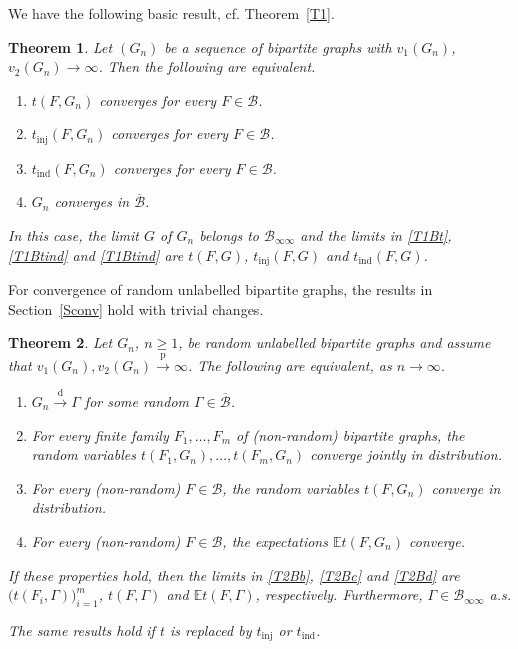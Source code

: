 \documentclass[11pt,reqno,tbtags]{amsart}
\numberwithin{equation}{section}
\newtheorem{theorem}{Theorem}[section]
\theoremstyle{definition}
\theoremstyle{remark}
\newenvironment{romenumerate}{\begin{enumerate}%
 \renewcommand{\labelenumi}{\textup{(\roman{enumi})}}%
 \renewcommand{\theenumi}{\textup{(\roman{enumi})}}%
 }{\end{enumerate}}
\newcommand{\refT}[1]{Theorem~\ref{#1}}
\newcommand{\refS}[1]{Section~\ref{#1}}
\newcommand\bigpar[1]{\bigl(#1\bigr)}
\newcommand\ntoo{\ensuremath{{n\to\infty}}}
\newcommand\cf{cf.\spacefactor=1000}
\newcommand{\tend}{\longrightarrow}
\newcommand\dto{\overset{\mathrm{d}}{\tend}}
\newcommand\pto{\overset{\mathrm{p}}{\tend}}
\newcommand\E{\operatorname{\mathbb E{}}}
\newcommand\gG{\Gamma}
\newcommand\cB{\mathcal B}
\renewcommand{\=}{:=}
\newcommand{\tinj}{t_{\mathrm{inj}}}
\newcommand{\tind}{t_{\mathrm{ind}}}
\newcommand{\BUxx}[2]{\cB_{#1#2}}
\newcommand{\cbq}{\overline{\cB}}
\newcommand{\cboo}{\BUxx{\infty}{\infty}}
\begin{document}
We have the following basic result, \cf{}
\refT{T1}.

\begin{theorem}\label{T1B}
 Let $(G_n)$ be a sequence of bipartite graphs with
 $v_1(G_n)$, $v_2(G_n)\to\infty$.
Then the following are equivalent.
\begin{romenumerate}
  \item\label{T1Bt}
$t(F,G_n)$ converges for every $F\in\cB$.
  \item\label{T1Btinj}
$\tinj(F,G_n)$ converges for every $F\in\cB$.
  \item\label{T1Btind}
$\tind(F,G_n)$ converges for every $F\in\cB$.
  \item
$G_n$ converges in $\cbq$.
\end{romenumerate}
In this case, the limit $G$ of $G_n$ belongs to $\cboo$ and the limits
in \ref{T1Bt}, \ref{T1Btind} and \ref{T1Btind} are $t(F,G)$,
$\tinj(F,G)$ and $\tind(F,G)$.
\end{theorem}

For convergence of random unlabelled bipartite graphs, the results in
\refS{Sconv} hold with trivial changes.

\begin{theorem}
  \label{T2B}
Let $G_n$, $n\ge1$, be random unlabelled bipartite graphs and assume that
$v_1(G_n),v_2(G_n)\pto\infty$.
The following are equivalent, as \ntoo.
\begin{romenumerate}
  \item\label{T2Ba}
$G_n\dto \gG$ for some random $\gG\in\cbq$.
  \item\label{T2Bb}
For every finite family $F_1,\dots,F_m$ of (non-random) bipartite graphs, the
random variables $t(F_1,G_n),\dots,t(F_m,G_n)$ converge jointly in
distribution. 
  \item\label{T2Bc}
For every (non-random) $F\in\cB$, the
random variables $t(F,G_n)$ converge in
distribution.
  \item\label{T2Bd}
For every (non-random) $F\in\cB$, the
expectations $\E t(F,G_n)$ converge.
\end{romenumerate}
If these properties hold, then the limits in \ref{T2Bb},
\ref{T2Bc} and \ref{T2Bd} are $\bigpar{t(F_i,\gG)}_{i=1}^m$, $t(F,\gG)$ and
$\E t(F,\gG)$, respectively. 
Furthermore, $\gG\in\cboo$ a.s.

The same results hold if $t$ is replaced by $\tinj$ or $\tind$.
\end{theorem}
\end{document}
